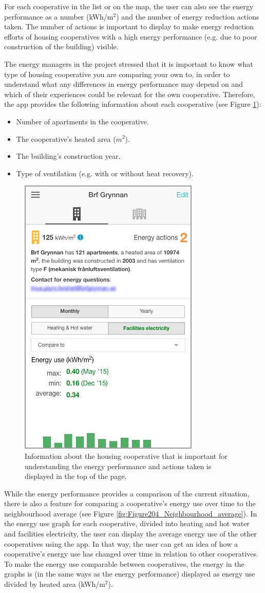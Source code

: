 For each cooperative in the list or on the map, the user can also see the energy performance as a number (kWh/m$^2$) and the number of energy reduction actions taken. The number of actions is important to display to make energy reduction efforts of housing cooperatives with a high energy performance (e.g. due to poor construction of the building) visible. 

The energy managers in the project stressed that it is important to know what type of housing cooperative you are comparing your own to, in order to understand what any differences in energy performance may depend on and which of their experiences could be relevant for the own cooperative. Therefore, the app provides the following information about each cooperative (see Figure \ref{fig:Figure203_cooperative_info}):
\begin{itemize}
\item Number of apartments in the cooperative.
\item The cooperative's heated area ($m^2$).
\item The building's construction year.
\item Type of ventilation (e.g. with or without heat recovery).
\end{itemize}

\begin{figure}[h!]
	\centering
	\includegraphics[width=0.4\linewidth]{img/Figure203_cooperative_info.png}
	\caption{Information about the housing cooperative that is important for understanding the energy performance and actions taken is displayed in the top of the page.}
	\label{fig:Figure203_cooperative_info}
\end{figure}

While the energy performance provides a comparison of the current situation, there is also a feature for comparing a cooperative's energy use over time to the neighbourhood average (see Figure \ref{fig:Figure204_Neighbourhood_average}). In the energy use graph for each cooperative, divided into heating and hot water and facilities electricity, the user can display the average energy use of the other cooperatives using the app. In that way, the user can get an idea of how a cooperative's energy use has changed over time in relation to other cooperatives. To make the energy use comparable between cooperatives, the energy in the graphs is (in the same ways as the energy performance) displayed as energy use divided by heated area (kWh/m$^2$).

